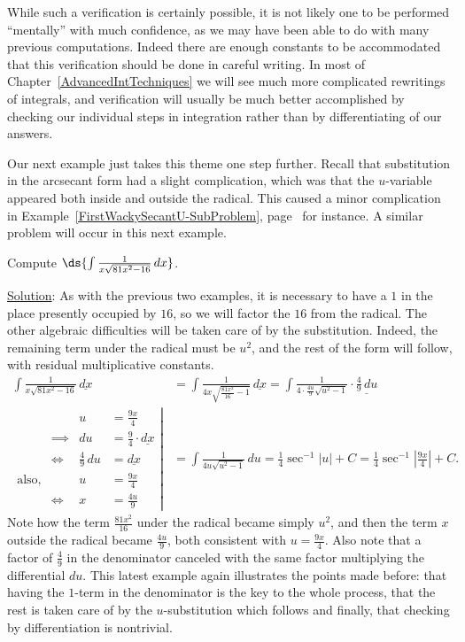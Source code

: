 While such a verification is certainly possible, it is not likely one
to be performed ``mentally'' with much confidence,
as we may have been able to do with
many previous computations.  Indeed 
there are enough constants to be accommodated
that this verification should be done in careful writing.
In most of 
Chapter~\ref{AdvancedIntTechniques} we will see much more complicated
rewritings of integrals, and  verification will usually be much better
accomplished by checking our individual steps in integration rather than
by differentiating of our answers.

Our next example just takes this theme one step further.  Recall
that substitution in the arcsecant form had a slight complication,
which was that the $u$-variable appeared both inside and outside
the radical.  This caused a minor complication in
Example~\ref{FirstWackySecantU-SubProblem}, 
page~\pageref{FirstWackySecantU-SubProblem} for instance.
A similar problem will occur in this next example.

\bex Compute $\ds{\int\frac1{x\sqrt{81x^2-16}}\,dx}$.

\underline{Solution}: As with the previous two examples,
it is necessary to have a $1$ in the place presently
occupied by $16$, so we will factor the $16$ from the
radical.  The other algebraic difficulties will be
taken care of by the substitution. Indeed, the remaining
term under the radical must be $u^2$, and the rest of the
form will follow, with residual multiplicative constants.
\begin{align*}
\int\frac1{x\sqrt{81x^2-16}}\,\underline{dx}
&=\int\frac1{4x\sqrt{\frac{81x^2}{16}-1}}\,\underline{dx}
=\int\frac1{4\cdot\frac{4u}9\sqrt{u^2-1}}\cdot\underline{\frac49\,du}\\
\left.\begin{alignedat}{2}
&&u&=\frac{9x}4\\
&\implies&du&=\frac94\cdot \underline{dx}\\
&\iff&\frac49\,du&=\underline{dx}\\
\hline
\text{also,}&&u&=\frac{9x}4\\
&\iff&x&=\frac{4u}9\end{alignedat}
\right|&=\int\frac1{4u\sqrt{u^2-1}}\,du
        =\frac14\sec^{-1}|u|+C
        =\frac14\sec^{-1}\left|\frac{9x}4\right|+C.
\end{align*}
Note how the term $\frac{81x^2}{16}$ under the radical became
simply $u^2$, and then the term $x$ outside the 
radical became $\frac{4u}{9}$, both consistent with
$u=\frac{9x}{4}$.  Also note that a factor of
$\frac49$ in the denominator canceled with the same
factor multiplying the differential $du$.
\eex
This latest example again illustrates the points made before:
that having the $1$-term 
in the denominator is the key to the whole process,
that the rest is taken care of by the $u$-substitution which follows
and finally, that checking by differentiation is nontrivial.

